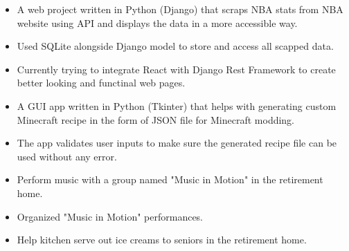 \documentclass[10pt,a4paper]{altacv}
\begin{document}
\divider

\begin{itemize}
    \item A web project written in Python (Django) that scraps NBA stats from NBA website using API and displays the data in a more accessible way.
    \item Used SQLite alongside Django model to store and access all scapped data.
    \item Currently trying to integrate React with Django Rest Framework to create better looking and functinal web pages.
\end{itemize}

\divider

\begin{itemize}
	\item A GUI app written in Python (Tkinter) that helps with generating custom Minecraft recipe in the form of JSON file for Minecraft modding.
	\item The app validates user inputs to make sure the generated recipe file can be used without any error.
\end{itemize}



\begin{itemize}
    \item Perform music with a group named "Music in Motion" in the retirement home.
    \item Organized "Music in Motion" performances.
    \item Help kitchen serve out ice creams to seniors in the retirement home.
\end{itemize}
\end{document}
